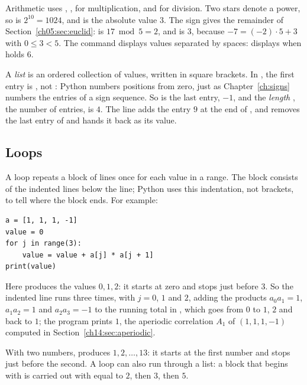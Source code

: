 Arithmetic uses \code{+}, \code{-}, \code{*} for multiplication, and \code{/} for division. Two stars denote a power, so  is $2^{10}=1024$, and  is the absolute value $3$. The sign \code{\%} gives the remainder of Section~\ref{ch05:sec:euclid}:  is $17\bmod 5=2$, and  is $3$, because $-7=(-2)\cdot5+3$ with $0\le3<5$. The command  displays values separated by spaces:  displays  when  holds $6$.

A \emph{list} is an ordered collection of values, written in square brackets. In , the first entry is , not : Python numbers positions from zero, just as Chapter~\ref{ch:signs} numbers the entries of a sign sequence. So  is the last entry, $-1$, and the \emph{length} , the number of entries, is $4$. The line  adds the entry $9$ at the end of , and  removes the last entry of  and hands it back as its value.

\subsection*{Loops}
A  loop repeats a block of lines once for each value in a range. The block consists of the indented lines below the  line; Python uses this indentation, not brackets, to tell where the block ends. For example:
\par\noindent\begin{minipage}{\linewidth}
\begin{lstlisting}
a = [1, 1, 1, -1]
value = 0
for j in range(3):
    value = value + a[j] * a[j + 1]
print(value)
\end{lstlisting}
\end{minipage}\par
Here  produces the values $0,1,2$: it starts at zero and stops just before $3$. So the indented line runs three times, with $j=0$, $1$ and $2$, adding the products $a_0a_1=1$, $a_1a_2=1$ and $a_2a_3=-1$ to the running total in , which goes from $0$ to $1$, $2$ and back to $1$; the program prints $1$, the aperiodic correlation $A_1$ of $(1,1,1,-1)$ computed in Section~\ref{ch14:sec:aperiodic}.

With two numbers,  produces $1,2,\ldots,13$: it starts at the first number and stops just before the second. A loop can also run through a list: a block that begins with  is carried out with  equal to $2$, then $3$, then $5$.

